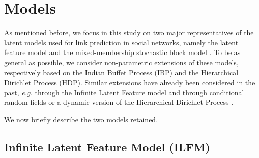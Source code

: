 \section{Models}
\label{sec:models}

As mentioned before, we focus in this study on two major representatives of the latent models used for link prediction in social networks, namely the latent feature model \cite{BMF} and the mixed-membership stochastic block model \cite{MMSB}. To be as general as possible, we consider non-parametric extensions of these models, respectively based on the Indian Buffet Process (IBP) and the Hierarchical Dirichlet Process (HDP). Similar extensions have already been considered in the past, {\it e.g.} through the Infinite Latent Feature model \cite{ILFRM} and through conditional random fields \cite{iMMSB} or a dynamic version of the Hierarchical Dirichlet Process \cite{diMMSB}.

We now briefly describe the two models retained.


\subsection{Infinite Latent Feature Model (ILFM)}

